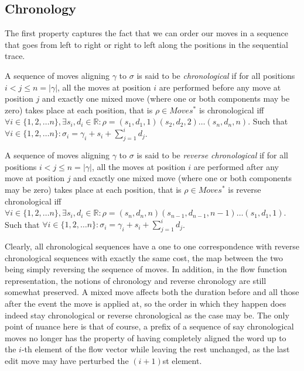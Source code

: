 \documentclass[runningheads]{llncs}
\begin{document}
    \subsection{Chronology}

    The first property captures the fact that we can order our moves in a sequence that goes from left to right or right to left along the positions in the sequential trace. 
    
    \begin{definition}[Chronology]
        A sequence of moves aligning $\gamma$ to $\sigma$ is said to be \textit{chronological} if for all positions $i < j \leq n = |\gamma|$, all the moves at position $i$ are performed before any move at position $j$ and exactly one mixed move (where one or both components may be zero) takes place at each position, that is $\rho \in Moves^*$ is chronological iff  $\forall i \in \{1, 2, \dots n\},  \exists s_i, d_i \in \mathbb{R}: \rho = (s_1, d_1, 1)(s_2, d_2, 2)\dots (s_n, d_n, n) $. 
        Such that $\forall i \in \{1, 2, \dots n\}: \sigma_i = \gamma_i + s_i + \sum_{j=1}^{i} d_j$. 
        
    \end{definition}
    
    \begin{definition}
        A sequence of moves aligning $\gamma$ to $\sigma$ is said to be \textit{reverse chronological} if for all positions $i < j \leq n = |\gamma|$, all the moves at position $i$ are performed after any move at position $j$ and exactly one mixed move (where one or both components may be zero) takes place at each position, that is $\rho \in Moves^*$ \color{secondrevision}is reverse chronological \color{black}iff  $\forall i \in \{1, 2, \dots n\},  \exists s_i, d_i \in \mathbb{R}:  \rho = (s_n, d_n, n)(s_{n-1}, d_{n-1}, n-1)\dots (s_1, d_1, 1) $. 
        Such that $\forall i \in \{1, 2, \dots n\}: \sigma_i = \gamma_i + s_i + \sum_{j=1}^{i} d_j$. 
    \end{definition}
    
    Clearly, all chronological sequences have a one to one correspondence with reverse chronological sequences with exactly the same cost, the map between the two being simply reversing the sequence of moves. 
    In addition, in the flow function representation, the notions of chronology and reverse chronology are still somewhat preserved. 
    A mixed move affects both the duration before and all those after the event the move is applied at, so the order in which they happen does indeed stay chronological or reverse chronological as the case may be. 
    The only point of nuance here is that of course, a prefix of a sequence of say chronological moves no longer has the property of having completely aligned the word up to the $i$-th element of the flow vector while leaving the rest unchanged, as the last edit move may have perturbed the $(i+1)$st element. 
    
\end{document}
